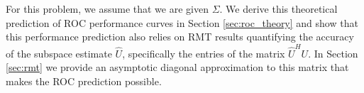 For this problem, we assume that we are given $\Sigma$. We derive this theoretical prediction of ROC performance curves in Section \ref{sec:roc_theory} and show that this performance prediction also relies on RMT results quantifying the accuracy of the subspace estimate $\widehat{U}$, specifically the entries of the matrix $\widehat{U}^HU$. In Section \ref{sec:rmt} we provide an asymptotic diagonal approximation to this matrix that makes the ROC prediction possible.
